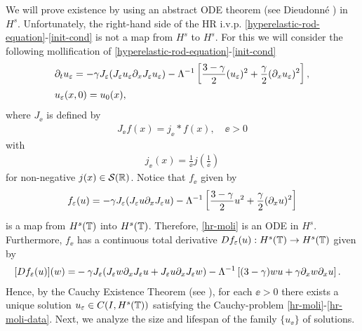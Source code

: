 We will prove existence by using an abstract ODE theorem (see Dieudonn\'e 
\cite{Dieudonne_1969_Foundations-of-}) in $H^s$. 
Unfortunately, the 
right-hand side of the HR i.v.p. \eqref{hyperelastic-rod-equation}-\eqref{init-cond}
is not a map from $H^s$ to $H^s$.
For this we will consider the following mollification of 
\eqref{hyperelastic-rod-equation}-\eqref{init-cond}
%
%
\begin{align}
\label{hr-moli}
& \partial_t  u_\varepsilon =
-\gamma J_\varepsilon(J_\varepsilon u_\varepsilon \partial_x  J_\varepsilon  u_\varepsilon) - \Lambda^{-1} \left 
[\frac{3-\gamma}{2}(u_\varepsilon)^2 + \frac{\gamma}{2}(\partial_x u_\varepsilon)^2 \right ],
\\
& u_\varepsilon(x, 0) = u_0 (x),
\label{hr-moli-data}
\end{align}
%
% 
%
%
%
%
%
%
where $J_\ee$ is defined  by
%
\begin{equation*}
\begin{split}
J_\ee f(x) = j_\ee * f(x), \quad \ee>0
\end{split}
\end{equation*}
%
with 
%
\begin{equation*}
\begin{split}
j_\ee(x) = \frac{1}{\ee}j\left( \frac{1}{\ee} \right)
\end{split}
\end{equation*}
%
for non-negative $j(x) \in
\mathcal{S}(\mathbb{R})$. Notice that  $f_\ee$ given by 
%
%
\begin{equation*}
\label{f_ep}
f_{\varepsilon}(u) = - \gamma J_\varepsilon(J_\varepsilon u \partial_x J_\varepsilon u)
- \Lambda^{-1} \left
[\frac{3-\gamma}{2}u^2 + \frac{\gamma}{2}(\partial_x u)^2 \right ]
\end{equation*}
%
is a map from $H^s(\mathbb{T})$  into $H^s(\mathbb{T})$. 
Therefore, \eqref{hr-moli}
is an ODE in $H^s$.
%
%
Furthermore, $f_\ee$ has a continuous total derivative $D f_\varepsilon (u): 
H^s(\mathbb{T}) \to H^s(\mathbb{T})$ given by
\begin{equation*}
	\label{total-deriv}
	\begin{split}
		[Df_{\varepsilon}(u)](w)
		=
		& -\gamma J_\varepsilon (J_\varepsilon w \partial_x J_\varepsilon u +
		J_\varepsilon u \partial_x J_\varepsilon w)
		- \Lambda^{-1} \left [(3-\gamma)w u + \gamma\partial_x w \partial_x u \right ].
	\end{split}
\end{equation*}
Hence, by the Cauchy Existence Theorem (see \cite{Dieudonne_1969_Foundations-of-}), for each 
$\ee > 0$ there exists a
unique solution $u_\varepsilon \in C(I, H^s(\mathbb{T}))$ satisfying the Cauchy-problem
\eqref{hr-moli}-\eqref{hr-moli-data}. Next, we analyze the size and
lifespan of the family $\{u_\ee\}$ of solutions.
%
%
%
%

